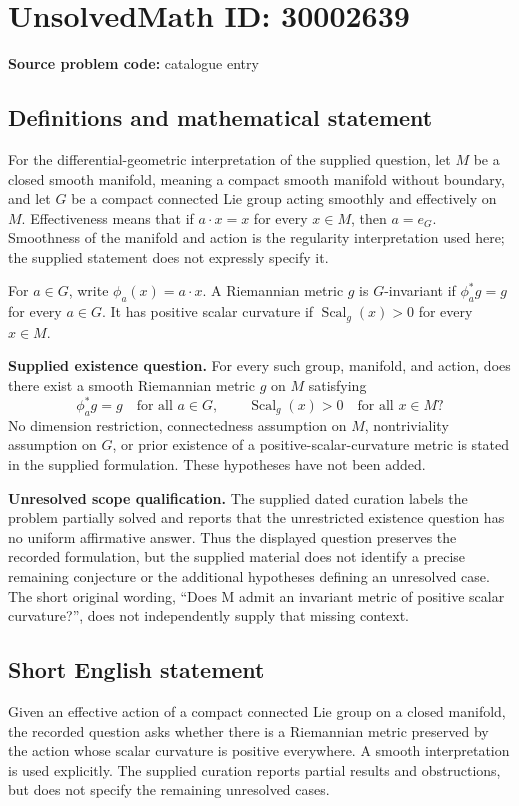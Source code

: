 \documentclass[11pt]{article}
\begin{document}
\section*{UnsolvedMath ID: 30002639}
\textbf{Source problem code:} catalogue entry
\subsection{Definitions and mathematical statement}
For the differential-geometric interpretation of the supplied question, let \(M\) be a closed smooth manifold, meaning a compact smooth manifold without boundary, and let \(G\) be a compact connected Lie group acting smoothly and effectively on \(M\). Effectiveness means that if \(a\cdot x=x\) for every \(x\in M\), then \(a=e_G\). Smoothness of the manifold and action is the regularity interpretation used here; the supplied statement does not expressly specify it.

For \(a\in G\), write \(\phi_a(x)=a\cdot x\). A Riemannian metric \(g\) is \(G\)-invariant if \(\phi_a^*g=g\) for every \(a\in G\). It has positive scalar curvature if \(\operatorname{Scal}_g(x)>0\) for every \(x\in M\).

\textbf{Supplied existence question.} For every such group, manifold, and action, does there exist a smooth Riemannian metric \(g\) on \(M\) satisfying
\[
\phi_a^*g=g\quad\text{for all }a\in G,
\qquad
\operatorname{Scal}_g(x)>0\quad\text{for all }x\in M?
\]
No dimension restriction, connectedness assumption on \(M\), nontriviality assumption on \(G\), or prior existence of a positive-scalar-curvature metric is stated in the supplied formulation. These hypotheses have not been added.

\textbf{Unresolved scope qualification.} The supplied dated curation labels the problem partially solved and reports that the unrestricted existence question has no uniform affirmative answer. Thus the displayed question preserves the recorded formulation, but the supplied material does not identify a precise remaining conjecture or the additional hypotheses defining an unresolved case. The short original wording, ``Does M admit an invariant metric of positive scalar curvature?'', does not independently supply that missing context.
\subsection{Short English statement}
Given an effective action of a compact connected Lie group on a closed manifold, the recorded question asks whether there is a Riemannian metric preserved by the action whose scalar curvature is positive everywhere. A smooth interpretation is used explicitly. The supplied curation reports partial results and obstructions, but does not specify the remaining unresolved cases.
\end{document}
